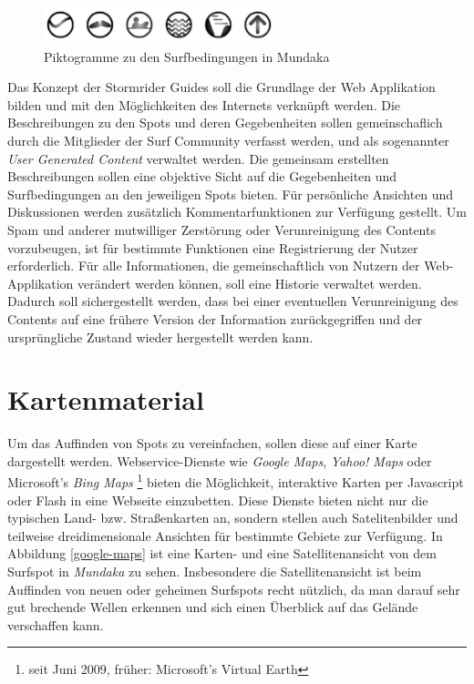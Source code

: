 \begin{figure}[t]
  \begin{center}
    \includegraphics[height=40px]{bilder/mundaka-conditions}
    \caption{Piktogramme zu den Surfbedingungen in Mundaka}
    \label{piktogramm}
  \end{center}
\end{figure}

Das Konzept der Stormrider Guides soll die Grundlage der Web
Applikation bilden und mit den Möglichkeiten des Internets verknüpft
werden. Die Beschreibungen zu den Spots und deren Gegebenheiten sollen
gemeinschaflich durch die Mitglieder der Surf Community verfasst
werden, und als sogenannter \textit{User Generated Content} verwaltet
werden. Die gemeinsam erstellten Beschreibungen sollen eine objektive
Sicht auf die Gegebenheiten und Surfbedingungen an den jeweiligen
Spots bieten. Für persönliche Ansichten und Diskussionen werden
zusätzlich Kommentarfunktionen zur Verfügung gestellt. Um Spam und
anderer mutwilliger Zerstörung oder Verunreinigung des Contents
vorzubeugen, ist für bestimmte Funktionen eine Registrierung der
Nutzer erforderlich. Für alle Informationen, die gemeinschaftlich von
Nutzern der Web-Applikation verändert werden können, soll eine
Historie verwaltet werden. Dadurch soll sichergestellt werden, dass
bei einer eventuellen Verunreinigung des Contents auf eine frühere
Version der Information zurückgegriffen und der ursprüngliche Zustand
wieder hergestellt werden kann.

\section{Kartenmaterial}

Um das Auffinden von Spots zu vereinfachen, sollen diese auf einer
Karte dargestellt werden. Webservice-Dienste wie \textit{Google Maps},
\textit{Yahoo! Maps} oder Microsoft's \textit{Bing Maps}
\footnote{seit Juni 2009, früher: Microsoft's Virtual Earth} bieten
die Möglichkeit, interaktive Karten per Java\-script oder Flash in
eine Webseite einzubetten. Diese Dienste bieten nicht nur die
typischen Land- bzw. Straßenkarten an, sondern stellen auch
Satelitenbilder und teilweise dreidimensionale Ansichten für bestimmte
Gebiete zur Verfügung. In Abbildung \ref{google-maps} ist eine Karten-
und eine Satellitenansicht von dem Surfspot in \textit{Mundaka} zu
sehen. Insbesondere die Satellitenansicht ist beim Auffinden von neuen
oder geheimen Surfspots recht nützlich, da man darauf sehr gut
brechende Wellen erkennen und sich einen Überblick auf das Gelände
verschaffen kann.

